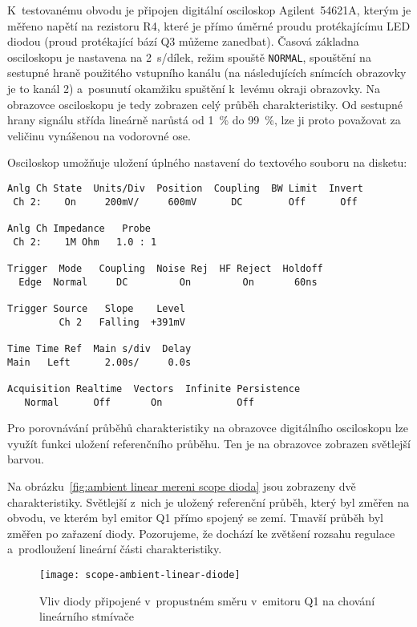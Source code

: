 K~testovanému obvodu je připojen digitální osciloskop Agilent~54621A, kterým je
měřeno napětí na rezistoru R4, které je přímo úměrné proudu protékajícímu LED
diodou (proud protékající bází Q3 můžeme zanedbat). Časová základna osciloskopu
je nastavena na \SI{2}{\second}/dílek, režim spouště \texttt{NORMAL}, spouštění
na sestupné hraně použitého vstupního kanálu (na následujících snímcích
obrazovky je to kanál 2) a~posunutí okamžiku spuštění k~levému okraji
obrazovky. Na obrazovce osciloskopu je tedy zobrazen celý průběh
charakteristiky. Od sestupné hrany signálu střída lineárně narůstá od
\SI{1}{\percent} do \SI{99}{\percent}, lze ji proto považovat za veličinu
vynášenou na vodorovné ose.

Osciloskop umožňuje uložení úplného nastavení do textového souboru na disketu:
\begin{lstlisting}[style=terminal]
Anlg Ch State  Units/Div  Position  Coupling  BW Limit  Invert
 Ch 2:    On     200mV/     600mV      DC        Off      Off

Anlg Ch Impedance   Probe
 Ch 2:    1M Ohm   1.0 : 1

Trigger  Mode   Coupling  Noise Rej  HF Reject  Holdoff
  Edge  Normal     DC         On         On       60ns

Trigger Source   Slope    Level
         Ch 2   Falling  +391mV

Time Time Ref  Main s/div  Delay
Main   Left      2.00s/     0.0s

Acquisition Realtime  Vectors  Infinite Persistence
   Normal      Off       On             Off
\end{lstlisting}

Pro porovnávání průběhů charakteristiky na obrazovce digitálního osciloskopu
lze využít funkci uložení referenčního průběhu. Ten je na obrazovce zobrazen
světlejší barvou.

Na obrázku~\vref{fig:ambient linear mereni scope dioda} jsou zobrazeny dvě
charakteristiky. Světlejší z~nich je uložený referenční průběh, který byl
změřen na obvodu, ve kterém byl emitor Q1 přímo spojený se zemí. Tmavší průběh
byl změřen po zařazení diody. Pozorujeme, že dochází ke zvětšení rozsahu
regulace a~prodloužení lineární části charakteristiky.

\begin{figure}[htbp]
    \centering
    \texttt{[image: scope-ambient-linear-diode]}
    \caption{%
        Vliv diody připojené v~propustném směru v~emitoru Q1 na chování
        lineárního stmívače
    }
    \label{fig:ambient linear mereni scope dioda}
\end{figure}


